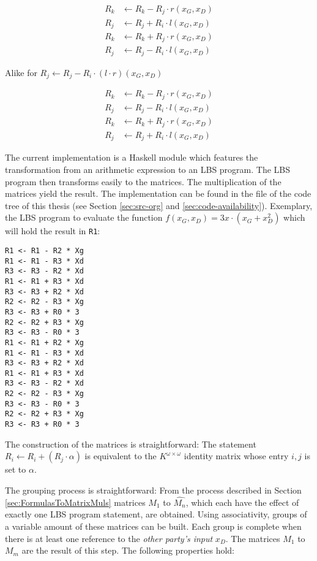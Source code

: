 \begin{align*}
R_k & \leftarrow R_k - R_j \cdot r(x_G, x_D) \\
R_j & \leftarrow R_j + R_i \cdot l(x_G, x_D) \\
R_k & \leftarrow R_k + R_j \cdot r(x_G, x_D) \\
R_j & \leftarrow R_j - R_i \cdot l(x_G, x_D)
\end{align*}

Alike for $R_j \leftarrow R_j - R_i \cdot (l \cdot r)(x_G, x_D)$

\begin{align*}
R_k & \leftarrow R_k - R_j \cdot r(x_G, x_D) \\
R_j & \leftarrow R_j - R_i \cdot l(x_G, x_D) \\
R_k & \leftarrow R_k + R_j \cdot r(x_G, x_D) \\
R_j & \leftarrow R_j + R_i \cdot l(x_G, x_D)
\end{align*}



The current implementation is a Haskell module which features the transformation
from an arithmetic expression to an LBS program. The LBS program then transforms
easily to the matrices. The multiplication of the matrices yield the result. The
implementation can be found in the file  of the code
tree of this thesis (see Section \ref{sec:src-org} and
\ref{sec:code-availability}). Exemplary, the LBS program to evaluate the
function $f(x_G,x_D) = 3x \cdot (x_G + x_D^2)$ which will hold the result in
\texttt{R1}:

\begin{lstlisting}
R1 <- R1 - R2 * Xg
R1 <- R1 - R3 * Xd
R3 <- R3 - R2 * Xd
R1 <- R1 + R3 * Xd
R3 <- R3 + R2 * Xd
R2 <- R2 - R3 * Xg
R3 <- R3 + R0 * 3
R2 <- R2 + R3 * Xg
R3 <- R3 - R0 * 3
R1 <- R1 + R2 * Xg
R1 <- R1 - R3 * Xd
R3 <- R3 + R2 * Xd
R1 <- R1 + R3 * Xd
R3 <- R3 - R2 * Xd
R2 <- R2 - R3 * Xg
R3 <- R3 - R0 * 3
R2 <- R2 + R3 * Xg
R3 <- R3 + R0 * 3
\end{lstlisting}

\noindent{}The construction of the matrices is straightforward: The statement
$R_i \leftarrow R_i + (R_j \cdot \alpha)$ is equivalent to the $K^{\omega \times
\omega}$ identity matrix whose entry $i,j$ is set to $\alpha$.


\label{sec:matrix-grouping}

The grouping process is straightforward: From the process described in Section
\ref{sec:FormulasToMatrixMuls} matrices $\widehat{M_1}$ to $\widehat{M_n}$,
which each have the effect of exactly one LBS program statement, are obtained.
Using associativity, groups of a variable amount of these matrices can be built.
Each group is complete when there is at least one reference to the \emph{other
party's input} $x_D$. The matrices $M_1$ to $M_m$ are the result of this step.
The following properties hold:

